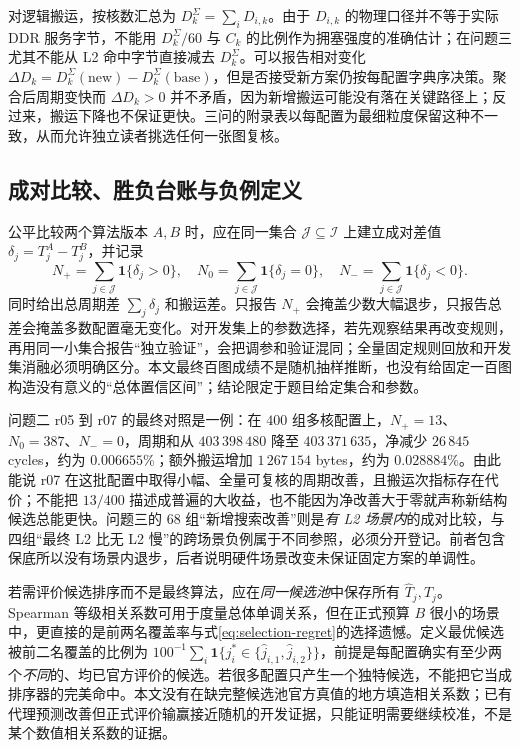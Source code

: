对逻辑搬运，按核数汇总为 $D_k^{\Sigma}=\sum_iD_{i,k}$。由于 $D_{i,k}$ 的物理口径并不等于实际 DDR 服务字节，不能用 $D_k^{\Sigma}/60$ 与 $C_k$ 的比例作为拥塞强度的准确估计；在问题三尤其不能从 L2 命中字节直接减去 $D_k^{\Sigma}$。可以报告相对变化 $\Delta D_k=D_k^{\Sigma}(\text{new})-D_k^{\Sigma}(\text{base})$，但是否接受新方案仍按每配置字典序决策。聚合后周期变快而 $\Delta D_k>0$ 并不矛盾，因为新增搬运可能没有落在关键路径上；反过来，搬运下降也不保证更快。三问的附录表以每配置为最细粒度保留这种不一致，从而允许独立读者挑选任何一张图复核。

\subsection{成对比较、胜负台账与负例定义}
公平比较两个算法版本 $A,B$ 时，应在同一集合 $\mathcal J\subseteq\mathcal I$ 上建立成对差值 $\delta_j=T_j^{A}-T_j^{B}$，并记录
\begin{equation}\label{eq:paired-counts}
N_+=\sum_{j\in\mathcal J}\mathbf1\{\delta_j>0\},\quad
N_0=\sum_{j\in\mathcal J}\mathbf1\{\delta_j=0\},\quad
N_-=\sum_{j\in\mathcal J}\mathbf1\{\delta_j<0\}.
\end{equation}
同时给出总周期差 $\sum_j\delta_j$ 和搬运差。只报告 $N_+$ 会掩盖少数大幅退步，只报告总差会掩盖多数配置毫无变化。对开发集上的参数选择，若先观察结果再改变规则，再用同一小集合报告“独立验证”，会把调参和验证混同；全量固定规则回放和开发集消融必须明确区分。本文最终百图成绩不是随机抽样推断，也没有给固定一百图构造没有意义的“总体置信区间”；结论限定于题目给定集合和参数。

问题二 r05 到 r07 的最终对照是一例：在 $400$ 组多核配置上，$N_+=13$、$N_0=387$、$N_-=0$，周期和从 $403\,398\,480$ 降至 $403\,371\,635$，净减少 $26\,845$ cycles，约为 $0.006655\%$；额外搬运增加 $1\,267\,154$ bytes，约为 $0.028884\%$。由此能说 r07 在这批配置中取得小幅、全量可复核的周期改善，且搬运次指标存在代价；不能把 $13/400$ 描述成普遍的大收益，也不能因为净改善大于零就声称新结构候选总能更快。问题三的 $68$ 组“新增搜索改善”则是\emph{有 L2 场景内}的成对比较，与四组“最终 L2 比无 L2 慢”的跨场景负例属于不同参照，必须分开登记。前者包含保底所以没有场景内退步，后者说明硬件场景改变未保证固定方案的单调性。

若需评价候选排序而不是最终算法，应在\emph{同一候选池}中保存所有 $\widehat T_j,T_j$。Spearman 等级相关系数可用于度量总体单调关系，但在正式预算 $B$ 很小的场景中，更直接的是前两名覆盖率与式\eqref{eq:selection-regret}的选择遗憾。定义最优候选被前二名覆盖的比例为 $100^{-1}\sum_i\mathbf1\{j_i^*\in\{\widehat j_{i,1},\widehat j_{i,2}\}\}$，前提是每配置确实有至少两个\emph{不同}的、均已官方评价的候选。若很多配置只产生一个独特候选，不能把它当成排序器的完美命中。本文没有在缺完整候选池官方真值的地方填造相关系数；已有代理预测改善但正式评价输赢接近随机的开发证据，只能证明需要继续校准，不是某个数值相关系数的证据。

